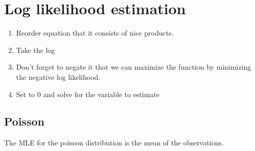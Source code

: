 \section{Log likelihood estimation}
\small
\begin{enumerate}
	\item Reorder equation that it consists of nice products.

	\item Take the log

	\item Don't forget to negate it that we can maximize the function by minimizing
		the negative log likelihood.

	\item Set to 0 and solve for the variable to estimate
\end{enumerate}
\subsection{Poisson}
The MLE for the poisson distribution is the mean of the observations.